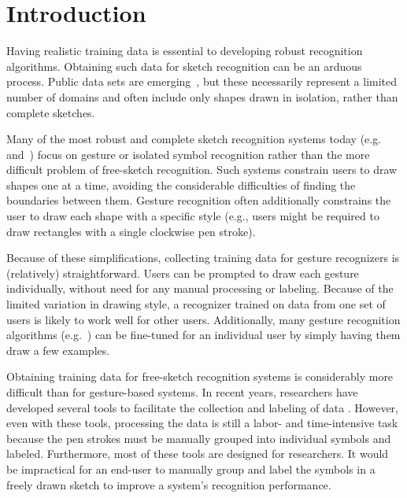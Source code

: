 \documentclass[final,5p,twocolumn]{elsarticle}
\begin{document}
\section{Introduction}
Having realistic training data is essential to developing robust
recognition algorithms.  Obtaining such data for sketch recognition 
can be an arduous process. Public data sets are
emerging~\cite{oltmans04,hse05,wolin07,paulson08,blagojevic08}, but these
necessarily represent a limited number of domains and often include
only shapes drawn in isolation, rather than complete sketches.

Many of the most robust and complete sketch recognition systems today
(e.g. \cite{zeleznik08} and~\cite{lee08}) focus
on gesture or isolated symbol recognition rather than the more
difficult problem of free-sketch recognition.  Such systems constrain
users to draw shapes one at a time, avoiding the considerable
difficulties of finding the boundaries between them.  Gesture
recognition often additionally constrains the user to draw each shape
with a specific style (e.g., users might be required to draw
rectangles with a single clockwise pen stroke).

Because of these simplifications, collecting training data for gesture
recognizers is (relatively) straightforward.  Users can be prompted to
draw each gesture individually, without need for any manual processing
or labeling.  Because of the limited variation in drawing style, a
recognizer trained on data from one set of users is likely to work
well for other users. Additionally, many gesture recognition
algorithms (e.g.~\cite{wobbrock07}) can be fine-tuned for an individual
user by simply having them draw a few examples.

Obtaining training data for free-sketch recognition systems is
considerably more difficult than for gesture-based systems. In recent
years, researchers have developed several tools to facilitate the
collection and labeling of data
\cite{wolin07,paulson08,blagojevic08}.  However,
even with these tools, processing the data is still a labor- and
time-intensive task because the pen strokes must be manually grouped
into individual symbols and labeled.  Furthermore, most of these tools
are designed for researchers. It would be impractical for an end-user
to manually group and label the symbols in a freely drawn sketch to improve a
system's recognition performance.
\end{document}
